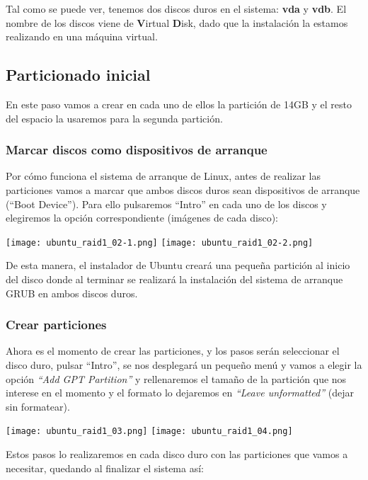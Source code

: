 Tal como se puede ver, tenemos dos discos duros en el sistema: \textbf{vda} y \textbf{vdb}. El nombre de los discos viene de \textbf{V}irtual \textbf{D}isk, dado que la instalación la estamos realizando en una máquina virtual.

\subsection{Particionado inicial}
En este paso vamos a crear en cada uno de ellos la partición de 14GB y  el resto del espacio la usaremos para la segunda partición.

\subsubsection{Marcar discos como dispositivos de arranque}
Por cómo funciona el sistema de arranque de Linux, antes de realizar las particiones vamos a marcar que ambos discos duros sean dispositivos de arranque (“Boot Device”). Para ello pulsaremos “Intro” en cada uno de los discos y elegiremos la opción correspondiente (imágenes de cada disco):

\begin{center}
    \texttt{[image: ubuntu\_raid1\_02-1.png]}
    \hspace{3cm}
    \texttt{[image: ubuntu\_raid1\_02-2.png]}
\end{center}

De esta manera, el instalador de Ubuntu creará una pequeña partición al inicio del disco donde al terminar se realizará la instalación del sistema de arranque GRUB en ambos discos duros.


\subsubsection{Crear particiones}
Ahora es el momento de crear las particiones, y los pasos serán seleccionar el disco duro, pulsar “Intro”, se nos desplegará un pequeño menú y vamos a elegir la opción  \textit{“Add GPT Partition”} y rellenaremos el tamaño de la partición que nos interese en el momento y el formato lo dejaremos en \textit{“Leave unformatted”} (dejar sin formatear).

\begin{center}
    \texttt{[image: ubuntu\_raid1\_03.png]}
    \hfill
    \texttt{[image: ubuntu\_raid1\_04.png]}
\end{center}

Estos pasos lo realizaremos en cada disco duro con las particiones que vamos a necesitar, quedando al finalizar el sistema así:

